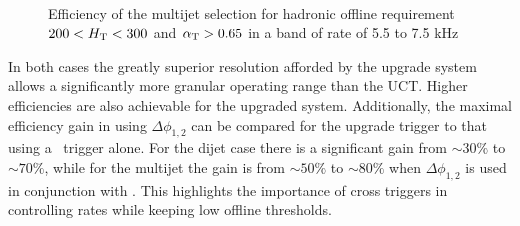 \begin{figure}
\centering
	~
	\caption{Efficiency of the multijet selection for hadronic offline requirement $200 < \mbox{$H_\text{T}$} < 300$ and $\alpha_{\text{T}} > 0.65$
	in a band of rate of 5.5 to 7.5 kHz}	
	    \label{fig:multijet_cross}
\end{figure}

In both cases the greatly superior resolution afforded by the upgrade system allows a significantly
more granular operating range than the UCT. Higher efficiencies are also achievable for 
the upgraded system. Additionally, the maximal efficiency gain in using $\Delta\phi_{1,2}$ can be compared for the upgrade trigger
to that using a \scalht~trigger alone. For the dijet case there is a significant gain from $\sim 30\%$ to $\sim 70\%$, while for
the multijet the gain is from $\sim 50\%$ to $\sim 80\%$ when $\Delta\phi_{1,2}$ is used in conjunction with \scalht.
This highlights the importance of cross triggers in controlling rates while keeping low offline thresholds.
